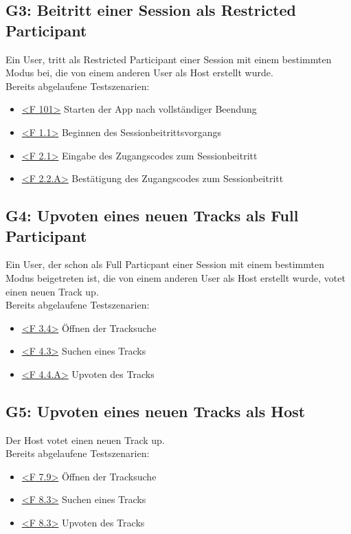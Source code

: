 \documentclass[oneside, ngerman]{sdqtechreport}
\begin{document}
\subsection{G3: Beitritt einer Session als Restricted Participant }
\label{subsec:Tests:GrundlegendeTestszenarien:G3}
\hypertarget{G3}{}
\newcommand{\gThree}{\hyperlink{G3}{G3: Beitritt einer Session als Restricted Participant }}
Ein User, tritt als Restricted Participant einer Session mit einem bestimmten Modus bei, die von einem anderen User als Host erstellt wurde. \\
Bereits abgelaufene Testszenarien: \gOne
\begin{itemize}
    \item \hyperlink{<F 101>}{<F 101>} Starten der App nach vollständiger Beendung
    \item \hyperlink{<F 1.1>}{<F 1.1>} Beginnen des Sessionbeitrittsvorgangs
    \item \hyperlink{<F 2.1>}{<F 2.1>} Eingabe des Zugangscodes zum Sessionbeitritt
    \item \hyperlink{<F 2.2.A>}{<F 2.2.A>} Bestätigung des Zugangscodes zum Sessionbeitritt
\end{itemize}

\subsection{G4: Upvoten eines neuen Tracks als Full Participant }
\label{subsec:Tests:GrundlegendeTestszenarien:G4}
\hypertarget{G4}{}
\newcommand{\gFour}{\hyperlink{G4}{G4: Upvoten eines neuen Tracks als Full Participant }}
Ein User, der schon als Full Particpant einer Session mit einem bestimmten Modus beigetreten ist, die von einem anderen User als Host erstellt wurde, votet einen neuen Track up. \\
Bereits abgelaufene Testszenarien: \gTwo
\begin{itemize}
    \item \hyperlink{<F 3.4>}{<F 3.4>} Öffnen der Tracksuche
    \item \hyperlink{<F 4.3>}{<F 4.3>} Suchen eines Tracks
    \item \hyperlink{<F 4.4.A>}{<F 4.4.A>} Upvoten des Tracks
\end{itemize}

\subsection{G5: Upvoten eines neuen Tracks als Host}
\label{subsec:Tests:GrundlegendeTestszenarien:G5}
\hypertarget{G5}{}
\newcommand{\gFive}{\hyperlink{G5}{G5: Upvoten eines neuen Tracks als Host }}
Der Host votet einen neuen Track up. \\
Bereits abgelaufene Testszenarien: \gOne
\begin{itemize}
    \item \hyperlink{<F 7.9>}{<F 7.9>} Öffnen der Tracksuche
    \item \hyperlink{<F 8.3>}{<F 8.3>} Suchen eines Tracks
    \item \hyperlink{<F 8.3>}{<F 8.3>} Upvoten des Tracks
\end{itemize}
\end{document}
